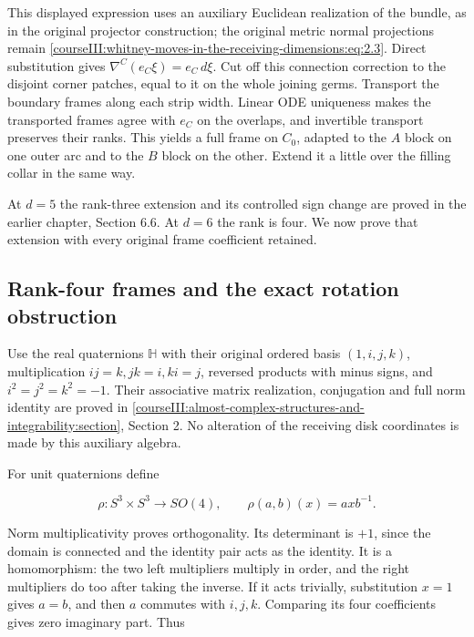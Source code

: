 This displayed expression uses an auxiliary Euclidean realization of the bundle, as in the original projector construction; the original metric normal projections remain \eqref{courseIII:whitney-moves-in-the-receiving-dimensions:eq:2.3}. Direct substitution gives \(\nabla^C(e_C\xi)=e_C\,d\xi\). Cut off this connection correction to the disjoint corner patches, equal to it on the whole joining germs. Transport the boundary frames along each strip width. Linear ODE uniqueness makes the transported frames agree with \(e_C\) on the overlaps, and invertible transport preserves their ranks. This yields a full frame on \(C_0\), adapted to the \(A\) block on one outer arc and to the \(B\) block on the other. Extend it a little over the filling collar in the same way.

At \(d=5\) the rank-three extension and its controlled sign change are proved in the earlier chapter, Section 6.6. At \(d=6\) the rank is four. We now prove that extension with every original frame coefficient retained.

\subsection{Rank-four frames and the exact rotation obstruction}
\label{courseIII:whitney-moves-in-the-receiving-dimensions:receiving-rank-four-frame}

\label{courseIII:whitney-moves-in-the-receiving-dimensions:section-3}\label{courseIII:whitney-receiving:3}

Use the real quaternions \(\mathbb H\) with their original ordered basis \((1,i,j,k)\), multiplication \(ij=k,jk=i,ki=j\), reversed products with minus signs, and \(i^2=j^2=k^2=-1\). Their associative matrix realization, conjugation and full norm identity are proved in \cref{courseIII:almost-complex-structures-and-integrability:section}, Section 2. No alteration of the receiving disk coordinates is made by this auxiliary algebra.

For unit quaternions define

\begin{equation}
\rho:S^3\times S^3\longrightarrow SO(4),\qquad
 \rho(a,b)(x)=a x b^{-1}.
 \label{courseIII:whitney-moves-in-the-receiving-dimensions:eq:3.1}
\end{equation}

Norm multiplicativity proves orthogonality. Its determinant is \(+1\), since the domain is connected and the identity pair acts as the identity. It is a homomorphism: the two left multipliers multiply in order, and the right multipliers do too after taking the inverse. If it acts trivially, substitution \(x=1\) gives \(a=b\), and then \(a\) commutes with \(i,j,k\). Comparing its four coefficients gives zero imaginary part. Thus

